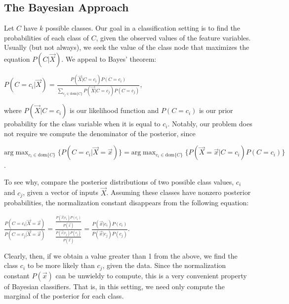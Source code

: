 \documentclass[12pt,twoside]{reedthesis}
\begin{document}
	\subsection*{The Bayesian Approach}
	Let $C$ have $k$ possible classes. 
	Our goal in a classification setting is to find the probabilities of each class of $C$, given the observed values of the feature variables. Usually (but not always), we seek the value of the class node that maximizes the equation $P(C | \vec{X})$. We appeal to Bayes' theorem:
	\begin{center}
		$P(C = c_i | \vec{X}) = \displaystyle\frac{P(\vec{X} | C = c_i) P(C = c_i)}{\displaystyle\sum_{c_j \in \textrm{dom}\{C\}} P(\vec{X} | C = c_j)P(C=c_j)}$,
	\end{center}
	where $P(\vec{X} | C = c_i)$ is our likelihood function and $P(C = c_i)$ is our prior probability for the class variable when it is equal to $c_i$. Notably, our problem does not require we compute the denominator of the posterior, since
	\begin{center} 
	$\displaystyle\textrm{arg}\max_{c_i \in \textrm{dom}\{C\}}{\{ P(C=c_i | \vec{X} = \vec{x}) \}} = \displaystyle\textrm{arg}\max_{c_i \in \textrm{dom}\{C\}}\{ P(\vec{X} = \vec{x} | C = c_i) P(C=c_i) \}$.
	\end{center}
	To see why, compare the posterior distributions of two possible class values, $c_i$ and $c_j$, given a vector of inputs $\vec{X}$. Assuming these classes have nonzero posterior probabilities, the normalization constant disappears from the following equation:
	\begin{center}
		$\displaystyle\frac{P(C=c_i | \vec{X} = \vec{x})}{P(C=c_j | \vec{X} = \vec{x})} = 
		\displaystyle\frac{\displaystyle\frac{P(\vec{x} | c_i)P( c_i)}{P(\vec{x})}}{\displaystyle\frac{P(\vec{x} | c_j) P( c_j)}{P(\vec{x})}} = \frac{P(\vec{x} | c_i) P( c_i)}{P(\vec{x} | c_j) P( c_j)}$.
	\end{center}
	Clearly, then, if we obtain a value greater than 1 from the above, we find the class $c_i$ to be more likely than $c_j$, given the data. Since the normalization constant $P(\vec{x})$ can be unwieldy to compute, this is a very convenient property of Bayesian classifiers. That is, in this setting, we need only compute the marginal of the posterior for each class.
\end{document}

